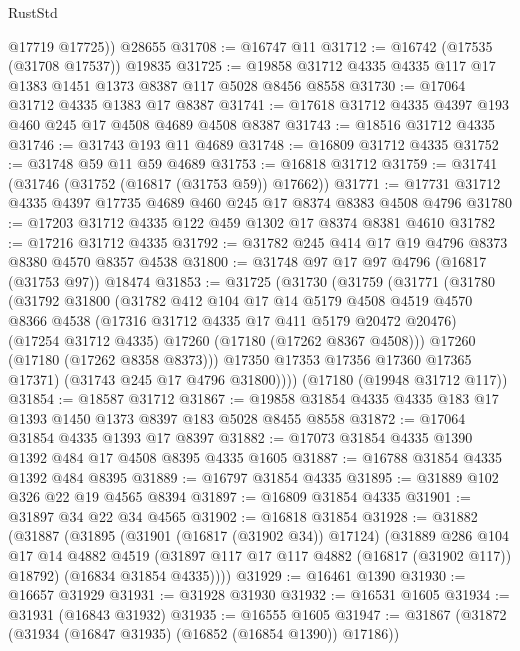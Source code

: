 \begin{lexlean}{RustStd}
\begin{coremodule}
        @17719
        @17725))
    @28655
@31708 := @16747 @11
@31712 := @16742 (@17535 (@31708 @17537)) @19835
@31725 := @19858 @31712 @4335 @4335 @117 @17 @1383 @1451 @1373 @8387 @117 @5028 @8456 @8558
@31730 := @17064 @31712 @4335 @1383 @17 @8387
@31741 := @17618 @31712 @4335 @4397 @193 @460 @245 @17 @4508 @4689 @4508 @8387
@31743 := @18516 @31712 @4335
@31746 := @31743 @193 @11 @4689
@31748 := @16809 @31712 @4335
@31752 := @31748 @59 @11 @59 @4689
@31753 := @16818 @31712
@31759 := @31741 (@31746 (@31752 (@16817 (@31753 @59)) @17662))
@31771 := @17731 @31712 @4335 @4397 @17735 @4689 @460 @245 @17 @8374 @8383 @4508 @4796
@31780 := @17203 @31712 @4335 @122 @459 @1302 @17 @8374 @8381 @4610
@31782 := @17216 @31712 @4335
@31792 := @31782 @245 @414 @17 @19 @4796 @8373 @8380 @4570 @8357 @4538
@31800 := @31748 @97 @17 @97 @4796 (@16817 (@31753 @97)) @18474
@31853 := @31725
    (@31730
      (@31759
        (@31771
          (@31780
            (@31792
              @31800
              (@31782
                @412
                @104
                @17
                @14
                @5179
                @4508
                @4519
                @4570
                @8366
                @4538
                (@17316 @31712 @4335 @17 @411 @5179 @20472 @20476)
                (@17254 @31712 @4335)
                @17260
                (@17180 (@17262 @8367 @4508)))
              @17260
              (@17180 (@17262 @8358 @8373)))
            @17350
            @17353
            @17356
            @17360
            @17365
            @17371)
          (@31743 @245 @17 @4796 @31800))))
    (@17180 (@19948 @31712 @117))
@31854 := @18587 @31712
@31867 := @19858 @31854 @4335 @4335 @183 @17 @1393 @1450 @1373 @8397 @183 @5028 @8455 @8558
@31872 := @17064 @31854 @4335 @1393 @17 @8397
@31882 := @17073 @31854 @4335 @1390 @1392 @484 @17 @4508 @8395 @4335 @1605
@31887 := @16788 @31854 @4335 @1392 @484 @8395
@31889 := @16797 @31854 @4335
@31895 := @31889 @102 @326 @22 @19 @4565 @8394
@31897 := @16809 @31854 @4335
@31901 := @31897 @34 @22 @34 @4565
@31902 := @16818 @31854
@31928 := @31882
    (@31887
      (@31895
        (@31901 (@16817 (@31902 @34)) @17124)
        (@31889
          @286
          @104
          @17
          @14
          @4882
          @4519
          (@31897 @117 @17 @117 @4882 (@16817 (@31902 @117)) @18792)
          (@16834 @31854 @4335))))
@31929 := @16461 @1390
@31930 := @16657 @31929
@31931 := @31928 @31930
@31932 := @16531 @1605
@31934 := @31931 (@16843 @31932)
@31935 := @16555 @1605
@31947 := @31867
    (@31872 (@31934 (@16847 @31935) (@16852 (@16854 @1390)) @17186))

\end{coremodule}
\end{lexlean}
